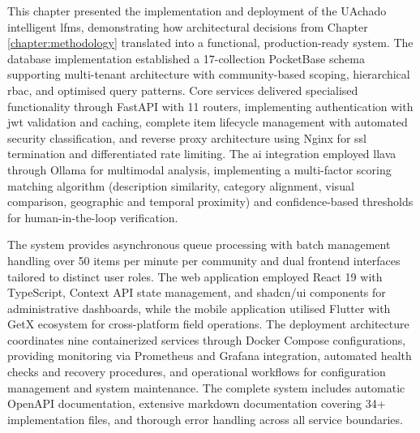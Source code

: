 This chapter presented the implementation and deployment of the UAchado intelligent \ac{lfms}, demonstrating how architectural decisions from Chapter \ref{chapter:methodology} translated into a functional, production-ready system. The database implementation established a 17-collection PocketBase schema supporting multi-tenant architecture with community-based scoping, hierarchical \ac{rbac}, and optimised query patterns. Core services delivered specialised functionality through FastAPI with 11 routers, implementing authentication with \ac{jwt} validation and caching, complete item lifecycle management with automated security classification, and reverse proxy architecture using Nginx for \ac{ssl} termination and differentiated rate limiting. The \ac{ai} integration employed \ac{llava} through Ollama for multimodal analysis, implementing a multi-factor scoring matching algorithm (description similarity, category alignment, visual comparison, geographic and temporal proximity) and confidence-based thresholds for human-in-the-loop verification.

The system provides asynchronous queue processing with batch management handling over 50 items per minute per community and dual frontend interfaces tailored to distinct user roles. The web application employed React 19 with TypeScript, Context API state management, and shadcn/ui components for administrative dashboards, while the mobile application utilised Flutter with GetX ecosystem for cross-platform field operations. The deployment architecture coordinates nine containerized services through Docker Compose configurations, providing monitoring via Prometheus and Grafana integration, automated health checks and recovery procedures, and operational workflows for configuration management and system maintenance. The complete system includes automatic OpenAPI documentation, extensive markdown documentation covering 34+ implementation files, and thorough error handling across all service boundaries.